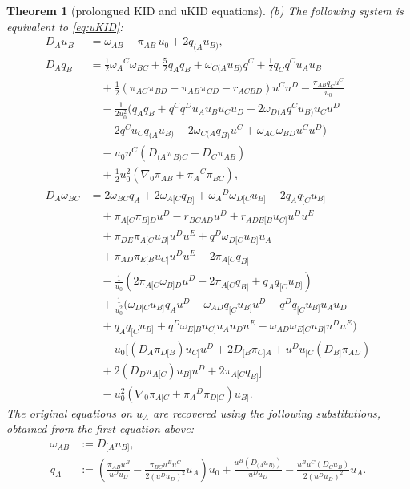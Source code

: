 \documentclass[10pt,a4paper]{amsart}
\newtheorem{thm}{Theorem}
\begin{document}
\begin{thm}[prolongued KID and uKID equations]
(b) The following system is equivalent to \eqref{eq:uKID}:
\begin{equation} \label{eq:canuKID}
\begin{aligned}
	D_A u_B &=
		\omega_{AB} - \pi_{AB}\,u_0 + 2 q_{(A} u_{B)},
\\
	D_A q_B &=
		\frac12 \omega_A{}^{C}\omega_{BC} + \frac52 q_A q_B + \omega_{C(A} u_{B)} q^{C} + \frac12 q_C q^{C} u_A u_B 
\\
& \quad
		+ \frac12 (\pi_{AC} \pi_{BD} - \pi_{AB} \pi_{CD} - r_{ACBD} ) u^{C} u^{D} - \frac{\pi_{AB} q_C u^{C}}{u_0}
\\
& \quad
		- \frac{1}{2 u_0^2} (q_A q_B + q^{C} q^{D} u_A u_B u_C u_D + 2\omega_{D(A} q^{C} u_{B)} u_C u^{D}
\\
& \quad
		- 2q^{C} u_C q_{(A} u_{B)} - 2\omega_{C(A} q_{B)} u^{C} + \omega_{AC} \omega_{BD} u^{C} u^{D} )		
\\
& \quad
		- u_0u^{C} ( D_{(A} \pi_{B)C} + D_C \pi_{AB} )
\\
& \quad
		+ \frac12 u_0^2 (\nabla_0 \pi_{AB} + \pi_A{}^{C} \pi_{BC}),
\\
	D_A \omega_{BC} & = 
		2 \omega_{BC} q_A + 2 \omega_{A[C} q_{B]} + \omega_A{}^D \omega_{D[C} u_{B]} - 2 q_A q_{[C} u_{B]}
\\
& \quad
		 + \pi_{A[C} \pi_{B]D} u^D - r_{BCAD} u^D + r_{ADE[B} u_{C]} u^D u^E
\\
& \quad		
		+ \pi_{DE} \pi_{A[C} u_{B]} u^D u^E + q^D \omega_{D[C} u_{B]} u_A
\\
& \quad
		+ \pi_{AD} \pi_{E[B} u_{C]} u^D u^E - 2 \pi_{A[C} q_{B]}
\\
& \quad
		- \frac{1}{u_0} (2 \pi_{A[C} \omega_{B]D} u^D - 2 \pi_{A[C} q_{B]} + q_A q_{[C} u_{B]})
\\
& \quad
		+ \frac{1}{u_0^2}(\omega_{D[C} u_{B]} q_A u^D - \omega_{AD} q_{[C} u_{B]} u^D - q^D q_{[C} u_{B]} u_A u_D 
\\
& \quad	
		+ q_A q_{[C} u_{B]} + q^D\omega_{E[B} u_{C]} u_A u_D u^E - \omega_{AD} \omega_{E[C} u_{B]} u^D u^E)  
\\
& \quad
		- u_0 [ (D_A \pi_{D[B}) u_{C]} u^D + 2D_{[B} \pi_{C]A} + u^D u_{[C} (D_{B]} \pi_{AD}) 
\\
& \quad
		+ 2 (D_D \pi_{A[C}) u_{B]} u^D + 2 \pi_{A[C} q_{B]}]
\\
& \quad
		- u_0^2 (\nabla_0 \pi_{A[C} + \pi_A{}^D \pi_{D[C}) u_{B]}.
\end{aligned}
\end{equation}
The original equations on $u_A$ are recovered using the following
substitutions, obtained from the first equation above:
\begin{equation} \label{eq:canuKID-defs}
\begin{aligned}
	\omega_{AB} &:= D_{[A}u_{B]}, \\
	q_A &:= \left( \frac{\pi_{AB} u^B}{u^D u_D} - \frac{\pi_{BC} u^B u^C}{2(u^D u_D)^2} u_A \right) u_0 + \frac{u^B(D_{(A} u_{B)})}{u^D u_D} - \frac{u^B u^C (D_C u_B)}{2(u^D u_D)^2} u_A .
\end{aligned}
\end{equation}
\end{thm}
\end{document}
